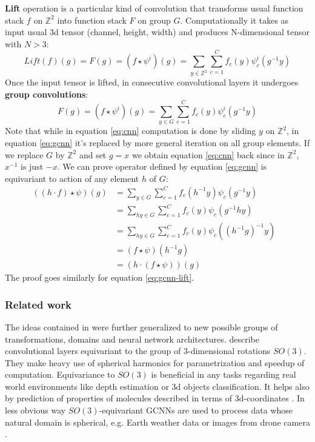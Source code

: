     \textbf{Lift} operation is a particular kind of convolution
    that transforms usual function stack $f$ on $\mathbb{Z}^2$ into
    function stack $F$ on group $G$. Computationally it takes as input
    usual 3d tensor (channel, height, width) and produces
    N-dimensional tensor with $N>3$:
    \begin{equation}
        \label{eq:gcnn-lift}
        \mathit{Lift}(f)(g) = F(g) = (f\star\psi^i)(g) = \sum_{y\in \mathbb{Z}^2}\sum_{c=1}^C
        f_c(y)\psi_{c}^{i}(g^{-1}y)
    \end{equation}
    Once the input tensor is lifted, in consecutive convolutional layers it
    undergoes \textbf{group convolutions}:
    \begin{equation}
        \label{eq:gcnn}
        F(g) = (f\star\psi^i)(g) = \sum_{y\in G}\sum_{c=1}^C
        f_c(y)\psi_{c}^{i}(g^{-1}y)
    \end{equation}
    Note that while in equation \ref{eq:cnn} computation is done by sliding
    $y$ on $\mathbb{Z}^2$, in equation \ref{eq:gcnn} it's replaced by more
    general iteration on all group elements. If we replace $G$ by $\mathbb{Z}^2$
    and set $g=x$ we obtain equation \ref{eq:cnn} back since in $\mathbb{Z}^2$,
    $x^{-1}$ is just $-x$. We can prove operator defined by equation
    \ref{eq:gcnn} is equivariant to action of any element $h$ of $G$:
    \begin{align*}
        ((h\cdot f)\star\psi)(g) & =
        \sum_{y\in G}\sum_{c=1}^C f_c(h^{-1}y)\psi_{c}(g^{-1}y)\\
        & = \sum_{hy\in G}\sum_{c=1}^C f_c(y)\psi_{c}(g^{-1}hy)\\
        & = \sum_{hy\in G}\sum_{c=1}^C f_c(y)\psi_{c}((h^{-1}g)^{-1}y)\\
        & = (f\star\psi)(h^{-1}g) &  \\
        & = (h\cdot(f\star\psi))(g)
    \end{align*}
    The proof goes similarly for equation \ref{eq:gcnn-lift}.

\subsubsection{Related work}
    The ideas contained in \cite{cohen2016} were further generalized to new
    possible groups of transformations, domains and neural network
    architectures. \cite{cohen_spherical_cnns, kondor_trivedi,
    esteves_so3} describe convolutional layers equivariant to
    the group of 3-dimensional rotations $\mathit{SO}(3)$.
    They make heavy use of spherical harmonics for parametrization and
    speedup of computation. Equivariance to $\mathit{SO}(3)$ is beneficial
    in any tasks regarding real world environments like depth estimation or 3d
    objects classification\cite{esteves_so3}. It helps also by
    prediction of properties of
    molecules described in terms of 3d-coordinates \cite{lieconv}.
    In less obvious way
    $\mathit{SO}(3)$-equivariant GCNNs are used to process data whose natural
    domain is spherical, e.g. Earth weather data or images from drone camera
    \cite{cohen_spherical_cnns}.

